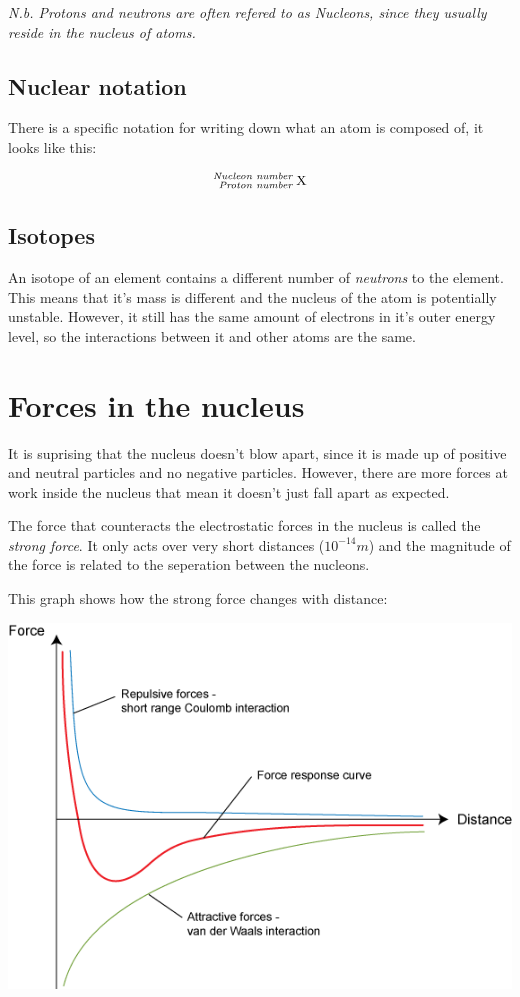 \documentclass{article}
\begin{document}
\textit{N.b. Protons and neutrons are often refered to as Nucleons, since they
usually reside in the nucleus of atoms.}

\subsection*{Nuclear notation}

There is a specific notation for writing down what an atom is composed of, it
looks like this:

\[
	\ce{^{\textrm{\it Nucleon number }}_{\textrm{\it Proton number }} X}
\]

\subsection*{Isotopes}

An isotope of an element contains a different number of {\it neutrons} to the
element. This means that it's mass is different and the nucleus of the atom is
potentially unstable. However, it still has the same amount of electrons in it's
outer energy level, so the interactions between it and other atoms are the same.

\section*{Forces in the nucleus}

It is suprising that the nucleus doesn't blow apart, since it is made up of
positive and neutral particles and no negative particles. However, there are
more forces at work inside the nucleus that mean it doesn't just fall apart as
expected.

The force that counteracts the electrostatic forces in the nucleus is called the
{\it strong force}. It only acts over very short distances ($10^{-14}m$) and the
magnitude of the force is related to the seperation between the nucleons.

This graph shows how the strong force changes with distance:

\begin{center}
	\includegraphics[scale=0.5]{force_graph}
\end{center}
\end{document}
